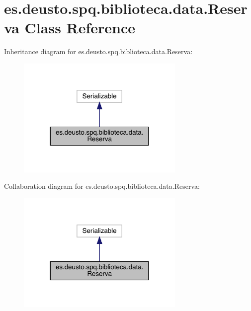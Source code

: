 \hypertarget{classes_1_1deusto_1_1spq_1_1biblioteca_1_1data_1_1_reserva}{}\section{es.\+deusto.\+spq.\+biblioteca.\+data.\+Reserva Class Reference}
\label{classes_1_1deusto_1_1spq_1_1biblioteca_1_1data_1_1_reserva}


Inheritance diagram for es.\+deusto.\+spq.\+biblioteca.\+data.\+Reserva\+:
\nopagebreak
\begin{figure}[H]
\begin{center}
\leavevmode
\includegraphics[width=228pt]{classes_1_1deusto_1_1spq_1_1biblioteca_1_1data_1_1_reserva__inherit__graph}
\end{center}
\end{figure}


Collaboration diagram for es.\+deusto.\+spq.\+biblioteca.\+data.\+Reserva\+:
\nopagebreak
\begin{figure}[H]
\begin{center}
\leavevmode
\includegraphics[width=228pt]{classes_1_1deusto_1_1spq_1_1biblioteca_1_1data_1_1_reserva__coll__graph}
\end{center}
\end{figure}
